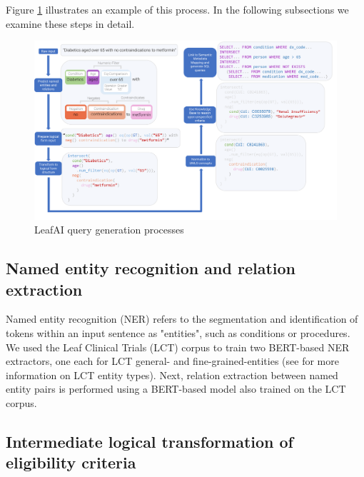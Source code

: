 \documentclass[../main.tex]{subfiles}
\begin{document}
\noindent Figure \ref{fig_leafai_querygen} illustrates an example of this process. In the following subsections we examine these steps in detail.

\begin{figure}[h]
  \includegraphics[scale=0.47]{figures/leafai_flow.pdf}  
\caption{LeafAI query generation processes}
\label{fig_leafai_querygen}
\end{figure}

\subsection*{Named entity recognition and relation extraction}

\noindent Named entity recognition (NER) refers to the segmentation and identification of tokens within an input sentence as "entities", such as conditions or procedures. We used the Leaf Clinical Trials (LCT) corpus \cite{dobbins2022leaf} to train two BERT-based \cite{devlin2018bert} NER extractors, one each for LCT general- and fine-grained-entities (see \cite{dobbins2022leaf} for more information on LCT entity types). Next, relation extraction between named entity pairs is performed using a BERT-based model also trained on the LCT corpus.

\subsection*{Intermediate logical transformation of eligibility criteria}
\end{document}
